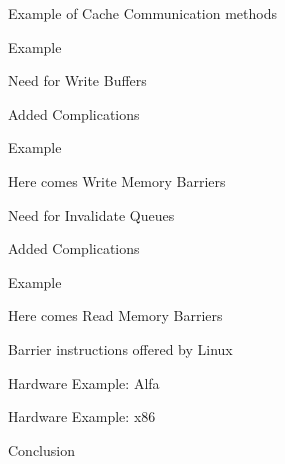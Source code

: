 \documentclass[notes, xcolor = dvipsnames]{beamer}
\begin{document}
    \begin{frame}{Example of Cache Communication methods}
        
    \end{frame}

    \begin{frame}{Example}
        
    \end{frame}

    \begin{frame}{Need for Write Buffers}
        
    \end{frame}

    \begin{frame}{Added Complications}
        
    \end{frame}

    \begin{frame}{Example}

    \end{frame}

    \begin{frame}{Here comes Write Memory Barriers}
        
    \end{frame}

    \begin{frame}{Need for Invalidate Queues}
        
    \end{frame}

    \begin{frame}{Added Complications}
        
    \end{frame}

    \begin{frame}{Example}
        
    \end{frame}

    \begin{frame}{Here comes Read Memory Barriers}
        
    \end{frame}

    \begin{frame}{Barrier instructions offered by Linux}
        
    \end{frame}

    \begin{frame}{Hardware Example: Alfa}
        
    \end{frame}

    \begin{frame}{Hardware Example: x86}
    
    \end{frame}

    \begin{frame}{Conclusion}
        
    \end{frame}
\end{document}
